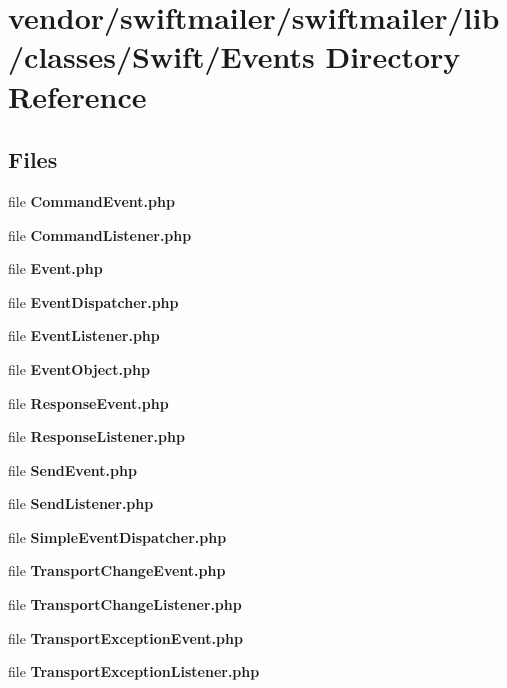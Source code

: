 \section{vendor/swiftmailer/swiftmailer/lib/classes/\+Swift/\+Events Directory Reference}
\label{dir_2dad13c1cd1ef57a03422f15a9509164}
\subsection*{Files}
\begin{DoxyCompactItemize}
\item 
file {\bf Command\+Event.\+php}
\item 
file {\bf Command\+Listener.\+php}
\item 
file {\bf Event.\+php}
\item 
file {\bf Event\+Dispatcher.\+php}
\item 
file {\bf Event\+Listener.\+php}
\item 
file {\bf Event\+Object.\+php}
\item 
file {\bf Response\+Event.\+php}
\item 
file {\bf Response\+Listener.\+php}
\item 
file {\bf Send\+Event.\+php}
\item 
file {\bf Send\+Listener.\+php}
\item 
file {\bf Simple\+Event\+Dispatcher.\+php}
\item 
file {\bf Transport\+Change\+Event.\+php}
\item 
file {\bf Transport\+Change\+Listener.\+php}
\item 
file {\bf Transport\+Exception\+Event.\+php}
\item 
file {\bf Transport\+Exception\+Listener.\+php}
\end{DoxyCompactItemize}
